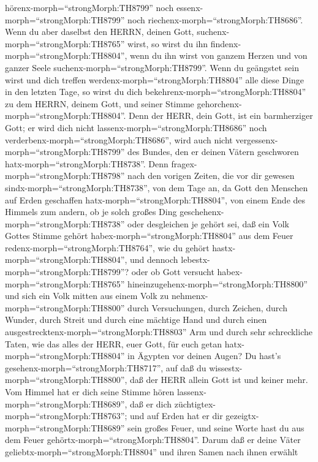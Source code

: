 hörenx-morph=``strongMorph:TH8799'' noch
essenx-morph=``strongMorph:TH8799'' noch
riechenx-morph=``strongMorph:TH8686''.  Wenn du aber
daselbst den HERRN, deinen Gott, suchenx-morph=``strongMorph:TH8765''
wirst, so wirst du ihn findenx-morph=``strongMorph:TH8804'', wenn du ihn
wirst von ganzem Herzen und von ganzer Seele
suchenx-morph=``strongMorph:TH8799''.  Wenn du geängstet
sein wirst und dich treffen werdenx-morph=``strongMorph:TH8804'' alle
diese Dinge in den letzten Tage, so wirst du dich
bekehrenx-morph=``strongMorph:TH8804'' zu dem HERRN, deinem Gott, und
seiner Stimme gehorchenx-morph=``strongMorph:TH8804''. 
Denn der HERR, dein Gott, ist ein barmherziger Gott; er wird dich nicht
lassenx-morph=``strongMorph:TH8686'' noch
verderbenx-morph=``strongMorph:TH8686'', wird auch nicht
vergessenx-morph=``strongMorph:TH8799'' des Bundes, den er deinen Vätern
geschworen hatx-morph=``strongMorph:TH8738''.  Denn
fragex-morph=``strongMorph:TH8798'' nach den vorigen Zeiten, die vor dir
gewesen sindx-morph=``strongMorph:TH8738'', von dem Tage an, da Gott den
Menschen auf Erden geschaffen hatx-morph=``strongMorph:TH8804'', von
einem Ende des Himmels zum andern, ob je solch großes Ding
geschehenx-morph=``strongMorph:TH8738'' oder desgleichen je gehört sei,
 daß ein Volk Gottes Stimme gehört
habex-morph=``strongMorph:TH8804'' aus dem Feuer
redenx-morph=``strongMorph:TH8764'', wie du gehört
hastx-morph=``strongMorph:TH8804'', und dennoch
lebestx-morph=``strongMorph:TH8799''?  oder ob Gott
versucht habex-morph=``strongMorph:TH8765''
hineinzugehenx-morph=``strongMorph:TH8800'' und sich ein Volk mitten aus
einem Volk zu nehmenx-morph=``strongMorph:TH8800'' durch Versuchungen,
durch Zeichen, durch Wunder, durch Streit und durch eine mächtige Hand
und durch einen ausgestrecktenx-morph=``strongMorph:TH8803'' Arm und
durch sehr schreckliche Taten, wie das alles der HERR, euer Gott, für
euch getan hatx-morph=``strongMorph:TH8804'' in Ägypten vor deinen
Augen?  Du hast's gesehenx-morph=``strongMorph:TH8717'',
auf daß du wissestx-morph=``strongMorph:TH8800'', daß der HERR allein
Gott ist und keiner mehr.  Vom Himmel hat er dich seine
Stimme hören lassenx-morph=``strongMorph:TH8689'', daß er dich
züchtigtex-morph=``strongMorph:TH8763''; und auf Erden hat er dir
gezeigtx-morph=``strongMorph:TH8689'' sein großes Feuer, und seine Worte
hast du aus dem Feuer gehörtx-morph=``strongMorph:TH8804''.
 Darum daß er deine Väter
geliebtx-morph=``strongMorph:TH8804'' und ihren Samen nach ihnen erwählt
